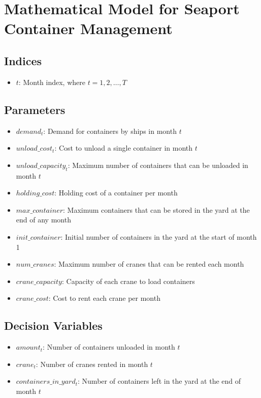 \documentclass{article}
\begin{document}
\section*{Mathematical Model for Seaport Container Management}

\subsection*{Indices}
\begin{itemize}
    \item $t$: Month index, where $t = 1, 2, \ldots, T$
\end{itemize}

\subsection*{Parameters}
\begin{itemize}
    \item $demand_t$: Demand for containers by ships in month $t$
    \item $unload\_cost_t$: Cost to unload a single container in month $t$
    \item $unload\_capacity_t$: Maximum number of containers that can be unloaded in month $t$
    \item $holding\_cost$: Holding cost of a container per month
    \item $max\_container$: Maximum containers that can be stored in the yard at the end of any month
    \item $init\_container$: Initial number of containers in the yard at the start of month 1
    \item $num\_cranes$: Maximum number of cranes that can be rented each month
    \item $crane\_capacity$: Capacity of each crane to load containers
    \item $crane\_cost$: Cost to rent each crane per month
\end{itemize}

\subsection*{Decision Variables}
\begin{itemize}
    \item $amount_t$: Number of containers unloaded in month $t$
    \item $crane_t$: Number of cranes rented in month $t$
    \item $containers\_in\_yard_t$: Number of containers left in the yard at the end of month $t$
\end{itemize}
\end{document}
